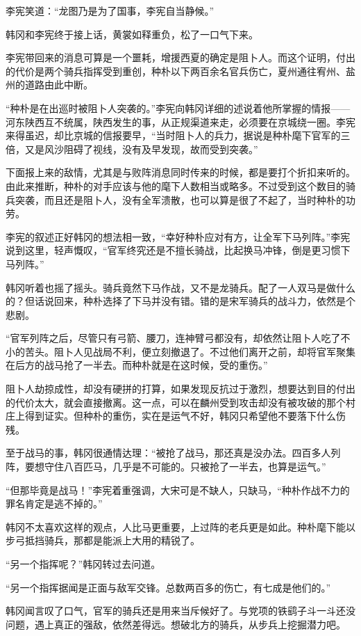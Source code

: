 李宪笑道：“龙图乃是为了国事，李宪自当静候。”

韩冈和李宪终于接上话，黄裳如释重负，松了一口气下来。

李宪带回来的消息可算是一个噩耗，增援西夏的确定是阻卜人。而这个证明，付出的代价是两个骑兵指挥受到重创，种朴以下两百余名官兵伤亡，夏州通往宥州、盐州的道路由此中断。

“种朴是在出巡时被阻卜人突袭的。”李宪向韩冈详细的述说着他所掌握的情报——河东陕西互不统属，陕西发生的事，从正规渠道来走，必须要在京城绕一圈。李宪来得虽迟，却比京城的信报要早，“当时阻卜人的兵力，据说是种朴麾下官军的三倍，又是风沙阻碍了视线，没有及早发现，故而受到突袭。”

下面报上来的敌情，尤其是与败阵消息同时传来的时候，都是要打个折扣来听的。由此来推断，种朴的对手应该与他的麾下人数相当或略多。不过受到这个数目的骑兵突袭，而且还是阻卜人，没有全军溃散，也可以算是很了不起了，当时种朴的功劳。

李宪的叙述正好韩冈的想法相一致，“幸好种朴应对有方，让全军下马列阵。”李宪说到这里，轻声慨叹，“官军终究还是不擅长骑战，比起换马冲锋，倒是更习惯下马列阵。”

韩冈听着也摇了摇头。骑兵竟然下马作战，又不是龙骑兵。配了一人双马是做什么的？但话说回来，种朴选择了下马并没有错。错的是宋军骑兵的战斗力，依然是个悲剧。

“官军列阵之后，尽管只有弓箭、腰刀，连神臂弓都没有，却依然让阻卜人吃了不小的苦头。阻卜人见战局不利，便立刻撤退了。不过他们离开之前，却将官军聚集在后方的战马抢了一半去。而种朴就是在这时候，受的重伤。”

阻卜人劫掠成性，却没有硬拼的打算，如果发现反抗过于激烈，想要达到目的付出的代价太大，就会直接撤离。这一点，可以在麟州受到攻击却没有被攻破的那个村庄上得到证实。但种朴的重伤，实在是运气不好，韩冈只希望他不要落下什么伤残。

至于战马的事，韩冈很通情达理：“被抢了战马，那还真是没办法。四百多人列阵，要想守住八百匹马，几乎是不可能的。只被抢了一半去，也算是运气。”

“但那毕竟是战马！”李宪着重强调，大宋可是不缺人，只缺马，“种朴作战不力的罪名肯定是逃不掉的。”

韩冈不太喜欢这样的观点，人比马更重要，上过阵的老兵更是如此。种朴麾下能以步弓抵挡骑兵，那都是能派上大用的精锐了。

“另一个指挥呢？”韩冈转过去问道。

“另一个指挥据闻是正面与敌军交锋。总数两百多的伤亡，有七成是他们的。”

韩冈闻言叹了口气，官军的骑兵还是用来当斥候好了。与党项的铁鹞子斗一斗还没问题，遇上真正的强敌，依然差得远。想破北方的骑兵，从步兵上挖掘潜力吧。

